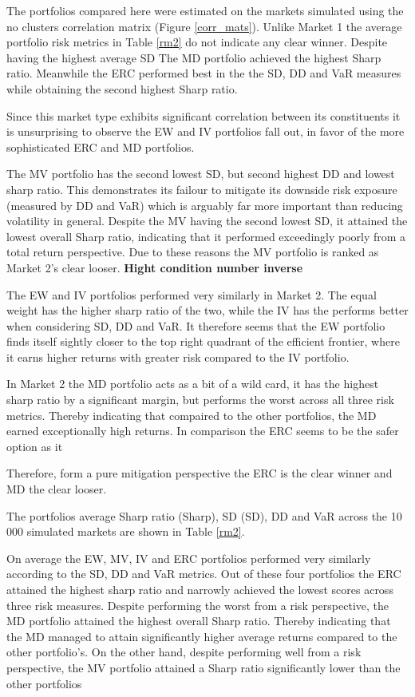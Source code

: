 \documentclass[11pt,preprint, authoryear]{elsarticle}
\numberwithin{equation}{section}
\numberwithin{figure}{section}
\numberwithin{table}{section}
\begin{document}
The portfolios compared here were estimated on the markets simulated
using the no clusters correlation matrix (Figure \ref{corr_mats}).
Unlike Market 1 the average portfolio risk metrics in Table \ref{rm2} do
not indicate any clear winner. Despite having the highest average SD The
MD portfolio achieved the highest Sharp ratio. Meanwhile the ERC
performed best in the the SD, DD and VaR measures while obtaining the
second highest Sharp ratio.

Since this market type exhibits significant correlation between its
constituents it is unsurprising to observe the EW and IV portfolios fall
out, in favor of the more sophisticated ERC and MD portfolios.

The MV portfolio has the second lowest SD, but second highest DD and
lowest sharp ratio. This demonstrates its failour to mitigate its
downside risk exposure (measured by DD and VaR) which is arguably far
more important than reducing volatility in general. Despite the MV
having the second lowest SD, it attained the lowest overall Sharp ratio,
indicating that it performed exceedingly poorly from a total return
perspective. Due to these reasons the MV portfolio is ranked as Market
2's clear looser. \textbf{Hight condition number inverse}

The EW and IV portfolios performed very similarly in Market 2. The equal
weight has the higher sharp ratio of the two, while the IV has the
performs better when considering SD, DD and VaR. It therefore seems that
the EW portfolio finds itself sightly closer to the top right quadrant
of the efficient frontier, where it earns higher returns with greater
risk compared to the IV portfolio.

In Market 2 the MD portfolio acts as a bit of a wild card, it has the
highest sharp ratio by a significant margin, but performs the worst
across all three risk metrics. Thereby indicating that compaired to the
other portfolios, the MD earned exceptionally high returns. In
comparison the ERC seems to be the safer option as it

Therefore, form a pure mitigation perspective the ERC is the clear
winner and MD the clear looser.

The portfolios average Sharp ratio (Sharp), SD (SD), DD and VaR across
the 10 000 simulated markets are shown in Table \ref{rm2}.

On average the EW, MV, IV and ERC portfolios performed very similarly
according to the SD, DD and VaR metrics. Out of these four portfolios
the ERC attained the highest sharp ratio and narrowly achieved the
lowest scores across three risk measures. Despite performing the worst
from a risk perspective, the MD portfolio attained the highest overall
Sharp ratio. Thereby indicating that the MD managed to attain
significantly higher average returns compared to the other portfolio's.
On the other hand, despite performing well from a risk perspective, the
MV portfolio attained a Sharp ratio significantly lower than the other
portfolios
\end{document}

